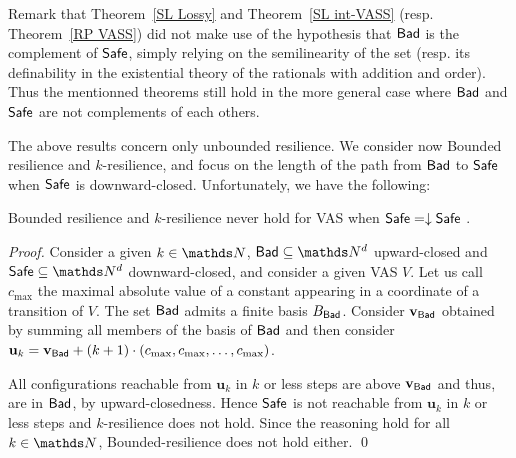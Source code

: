 Remark that
Theorem~\ref{SL Lossy} and
Theorem~\ref{SL int-VASS}
(resp. Theorem~\ref{RP VASS})
did not make use of the hypothesis that $\textsf{Bad}$ is the complement of $\textsf{Safe}$, simply relying on the
semilinearity of the set (resp. its definability in the existential theory of the rationals with addition and order). Thus 
the mentionned theorems still hold in the more general case where $\textsf{Bad}$ and $\textsf{Safe}$ are not complements of each others.

The above results concern only unbounded resilience. We consider now 
{\sc Bounded resilience} and {\sc $k$-resilience}, and focus on the length of
the path from $\textsf{Bad}$ to $\textsf{Safe}$
when $\textsf{Safe}$ is downward-closed. Unfortunately, we have the following:
\begin{proposition}
{\sc Bounded resilience} and {\sc $k$-resilience} never hold for VAS when $\textsf{Safe} = \downarrow \textsf{Safe}$%
.
\end{proposition}


\begin{proof}
Consider a given $k \in \N$,
 $\Bad \subseteq \N^d$ upward-closed and $\Safe \subseteq \N^d$ downward-closed, and
consider a given VAS $V$.
Let us call $c_{\max}$ the maximal absolute value of a constant appearing in a coordinate of a transition of $V$.
The set $\textsf{Bad}$ admits a finite basis $B_{\textsf{Bad}}$.
Consider $\textbf{v}_{\textsf{Bad}}$ obtained by summing all members of the basis of $\textsf{Bad}$ and then consider 
$\textbf{u}_k = \textbf{v}_{\textsf{Bad}} + (k+1) \cdot (c_{\max}, c_{\max}, \ldots, c_{\max})$.

All configurations reachable from $\textbf{u}_k$ in $k$ or less steps are above $ \textbf{v}_{\textsf{Bad}} $
and thus, are in $\textsf{Bad}$, by upward-closedness.
Hence  $\textsf{Safe}$ is not reachable from $\textbf{u}_k$ in $k$ or less steps  and {$k$-resilience} does not hold.
Since the reasoning hold for all $k \in \N$, {\sc Bounded-resilience} does not hold either.
\qed
\end{proof}

